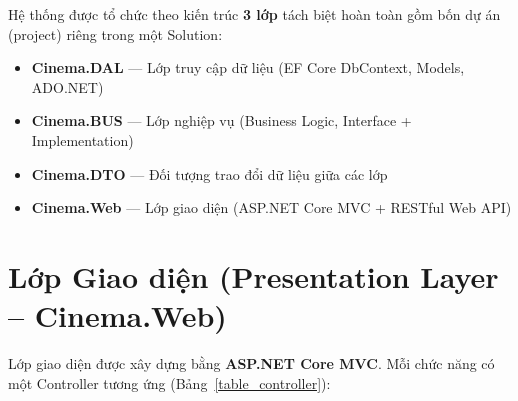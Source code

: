 \documentclass[12pt,a4paper,oneside]{book}
\theoremstyle{plain}
\numberwithin{equation}{chapter}
\begin{document}
\noindent Hệ thống được tổ chức theo kiến trúc \textbf{3 lớp} tách biệt hoàn toàn gồm bốn dự án (project) riêng trong một Solution:

\begin{itemize}
    \item \textbf{Cinema.DAL} --- Lớp truy cập dữ liệu (EF Core DbContext, Models, ADO.NET)
    \item \textbf{Cinema.BUS} --- Lớp nghiệp vụ (Business Logic, Interface + Implementation)
    \item \textbf{Cinema.DTO} --- Đối tượng trao đổi dữ liệu giữa các lớp
    \item \textbf{Cinema.Web} --- Lớp giao diện (ASP.NET Core MVC + RESTful Web API)
\end{itemize}

\section{Lớp Giao diện (Presentation Layer -- Cinema.Web)}\label{Sec3.1}

\noindent Lớp giao diện được xây dựng bằng \textbf{ASP.NET Core MVC}. Mỗi chức năng có một Controller tương ứng (Bảng~\ref{table_controller}):
\end{document}
